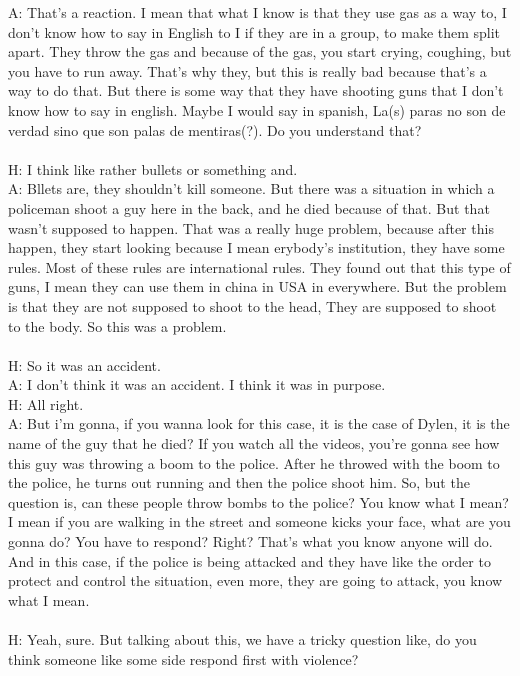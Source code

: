 \documentclass{phyasgn}\usepackage{nag}
\begin{document}
A: That's a reaction. I mean that what I know is that they use gas as a way to, I don't know how to say in English to I if they are in a group, to make them split apart. They throw the gas and because of the gas, you start crying, coughing, but you have to run away. That's why they, but this is really bad because that's a way to do that. But there is some way that they have shooting guns that I don't know how to say in english. Maybe I would say in spanish, La(s) paras no son de verdad sino que son palas de mentiras(?). Do you understand that?\\
\\
H: I think like rather bullets or something and.\\
A: Bllets are, they shouldn't kill someone. But there was a situation in which a policeman shoot a guy here in the back, and he died because of that. But that wasn't supposed to happen. That was a really huge problem, because after this happen, they start looking because I mean erybody's institution, they have some rules. Most of these rules are international rules. They found out that this type of guns, I mean they can use them in china in USA in everywhere. But the problem is that they are not supposed to shoot to the head, They are supposed to shoot to the body. So this was a problem.\\
\\
H: So it was an accident.\\
A: I don't think it was an accident. I think it was in purpose.\\
H: All right.\\
A: But i'm gonna, if you wanna look for this case, it is the case of Dylen, it is the name of the guy that he died? If you watch all the videos, you're gonna see how this guy was throwing a boom to the police. After he throwed with the boom to the police, he turns out running and then the police shoot him. So, but the question is, can these people throw bombs to the police? You know what I mean? I mean if you are walking in the street and someone kicks your face, what are you gonna do? You have to respond? Right? That's what you know anyone will do. And in this case, if the police is being attacked and they have like the order to protect and control the situation, even more, they are going to attack, you know what I mean.\\
\\
H: Yeah, sure. But talking about this, we have a tricky question like, do you think someone like some side respond first with violence?\\
\end{document}
